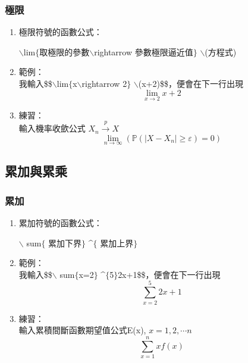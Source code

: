 \subsubsection{極限}
\begin{enumerate}
\item 極限符號的函數公式：\\
\begin{center}
$\backslash$lim\textunderscore$\{$取極限的參數$\backslash$rightarrow 參數極限逼近值$\}$ $\backslash$\;(方程式)
\end{center}
\item 範例：\\
我輸入\$\$$\backslash$lim\textunderscore$\{$x$\backslash$rightarrow 2$\}$ $\backslash$\;(x+2)\$\$，便會在下一行出現$$\lim_{x\rightarrow 2} x+2$$
\item 練習：\\
輸入機率收歛公式 $X_{n}\stackrel{p}{\longrightarrow} X $
\begin{equation}\label{int2}
\lim_{n\rightarrow \infty} (\mathbb{P}(|X-X_{n}|\geq\varepsilon)=0) 
\end{equation}
\end{enumerate}
\subsection{累加與累乘}
\subsubsection{累加}
\begin{enumerate}
\item 累加符號的函數公式：\\
\begin{center}
$\backslash$ sum\textunderscore  $\{$ 累加下界$\}$  \textasciicircum $\{$ 累加上界$\}$
\end{center}
\item 範例：\\
我輸入\$\$$\backslash$ sum\textunderscore  $\{$x=2$\}$  \textasciicircum $\{$5$\}$2x+1\$\$，便會在下一行出現$$\sum_  {x=2}^{5}2x+1$$
\item 練習：\\
輸入累積間斷函數期望值公式E(x), $x=1,2,\cdots n$
\begin{equation}\label{sum1}
\sum_{x=1}^{n}xf(x)
\end{equation}
\end{enumerate}
\newpage

